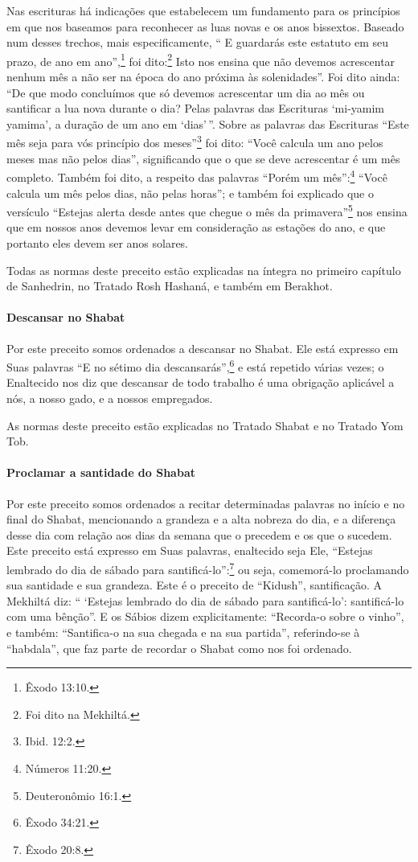 Nas escrituras há indicações que estabelecem um fundamento para
os princípios em que nos baseamos para reconhecer as luas novas e os
anos bissextos. Baseado num desses trechos, mais especificamente, `` E
guardarás este estatuto em seu prazo, de ano em ano'',\footnote{Êxodo 13:10.} foi
dito:\footnote{Foi dito na Mekhiltá.} Isto nos
ensina que não devemos acrescentar nenhum mês a não ser na época do ano
próxima às solenidades''. Foi dito ainda: ``De que modo concluímos que
só devemos acrescentar um dia ao mês ou santificar a lua nova durante o dia?
Pelas palavras das Escrituras `mi-yamim yamima', a duração de um ano em
`dias'\,''. Sobre as palavras das Escrituras ``Este mês seja para vós
princípio dos meses''\footnote{Ibid. 12:2.} foi dito: ``Você calcula um ano pelos
meses mas não pelos dias'', significando que o que se deve acrescentar é
um mês completo. Também foi dito, a respeito das palavras ``Porém um
mês'':\footnote{Números 11:20.} ``Você calcula um mês pelos dias, não pelas
horas''; e também foi explicado que o versículo ``Estejas alerta desde
antes que chegue o mês da primavera''\footnote{Deuteronômio 16:1.} nos ensina que
em nossos anos devemos levar em consideração as estações do ano, e que
portanto eles devem ser anos solares.

Todas as normas deste preceito estão explicadas na íntegra no primeiro
capítulo de Sanhedrin, no Tratado Rosh Hashaná, e também em Berakhot.

\paragraph{Descansar no Shabat}

Por este preceito somos ordenados a descansar no Shabat. Ele está
expresso em Suas palavras ``E no sétimo dia descansarás'',\footnote{Êxodo 34:21.}
e está repetido várias vezes; o Enaltecido nos diz que descansar de todo
trabalho é uma obrigação aplicável a nós, a nosso gado, e a nossos
empregados.

As normas deste preceito estão explicadas no Tratado Shabat e no Tratado
Yom Tob.

\paragraph{Proclamar a santidade do Shabat}

Por este preceito somos ordenados a recitar determinadas palavras no
início e no final do Shabat, mencionando a grandeza e a alta nobreza do
dia, e a diferença desse dia com relação aos dias da semana que o
precedem e os que o sucedem. Este preceito está expresso em Suas
palavras, enaltecido seja Ele, ``Estejas lembrado do dia de sábado para
santificá-lo'':\footnote{Êxodo 20:8.} ou seja, comemorá-lo proclamando sua
santidade e sua grandeza. Este é o preceito de ``Kidush'',
santificação. A Mekhiltá diz: `` `Estejas lembrado do dia de sábado para
santificá-lo': santificá-lo com uma bênção''. E os Sábios dizem
explicitamente: ``Recorda-o sobre o vinho'', e também: ``Santifica-o na
sua chegada e na sua partida'', referindo-se à ``habdala'', que faz
parte de recordar o Shabat como nos foi ordenado.

